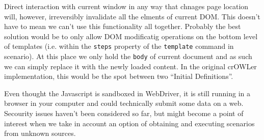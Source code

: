 Direct interaction with current window in any way that chnages page location
will, however, irreversibly invalidate all the elments of current DOM. This
doesn't have to mean we can't use this functionality all together. Probably the
best solution would be to only allow DOM modificatig operations on the bottom
level of templates (i.e. within the {\tt steps} property of the {\tt template}
command in scenario). At this place we only hold the {\tt body} of current
document and as such we can simply replace it with the newly loaded content. 
In the original crOWLer implementation, this would be the spot between two
``Initial Definitions''. 

Even thought the Javascript is sandboxed in WebDriver, it is still running in a
browser in your computer and could technically submit some data on a web.
Secourity issues haven't been considered so far, but might become a point of
interest when we take in account an option of obtaining and executing scenarios
from unknown sources. 


